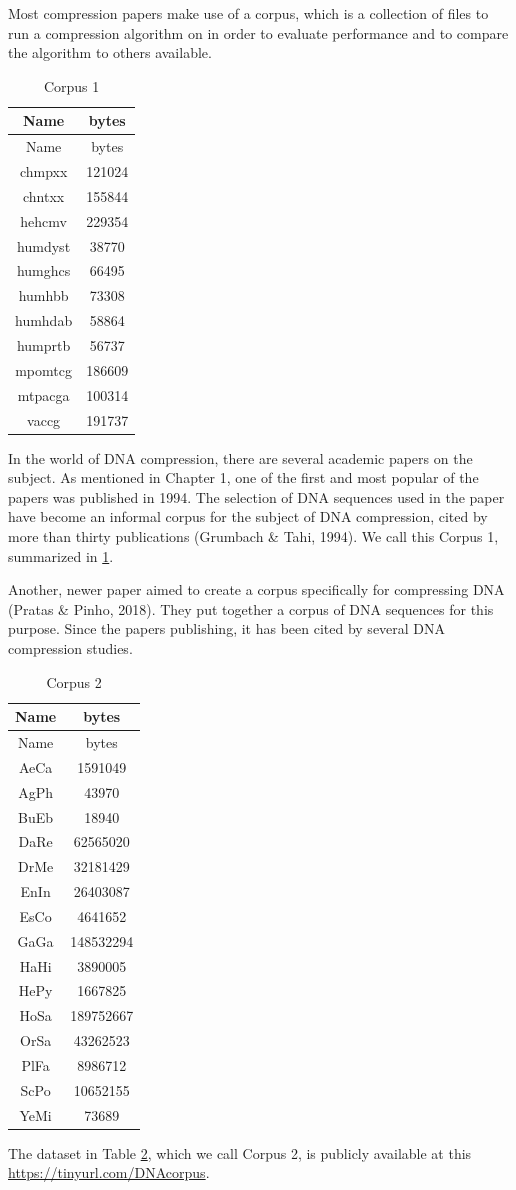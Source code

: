\documentclass[12pt,twoside]{reedthesis}
\begin{document}
Most compression papers make use of a corpus, which is a collection of files to run a compression algorithm on in order to evaluate performance and to compare the algorithm to others available.
\begin{longtable}[]{@{}cc@{}}
\caption{\label{tab:corpus1filesfig}Corpus 1}\tabularnewline
\toprule()
Name & bytes \\
\midrule()
\endfirsthead
\toprule()
Name & bytes \\
\midrule()
\endhead
chmpxx & 121024 \\
chntxx & 155844 \\
hehcmv & 229354 \\
humdyst & 38770 \\
humghcs & 66495 \\
humhbb & 73308 \\
humhdab & 58864 \\
humprtb & 56737 \\
mpomtcg & 186609 \\
mtpacga & 100314 \\
vaccg & 191737 \\
\bottomrule()
\end{longtable}
In the world of DNA compression, there are several academic papers on the subject. As mentioned in Chapter 1, one of the first and most popular of the papers was published in 1994. The selection of DNA sequences used in the paper have become an informal corpus for the subject of DNA compression, cited by more than thirty publications (Grumbach \& Tahi, 1994). We call this Corpus 1, summarized in \ref{tab:corpus1filesfig}.

Another, newer paper aimed to create a corpus specifically for compressing DNA (Pratas \& Pinho, 2018). They put together a corpus of DNA sequences for this purpose. Since the papers publishing, it has been cited by several DNA compression studies.
\begin{longtable}[]{@{}cc@{}}
\caption{\label{tab:corpus2filesfig}Corpus 2}\tabularnewline
\toprule()
Name & bytes \\
\midrule()
\endfirsthead
\toprule()
Name & bytes \\
\midrule()
\endhead
AeCa & 1591049 \\
AgPh & 43970 \\
BuEb & 18940 \\
DaRe & 62565020 \\
DrMe & 32181429 \\
EnIn & 26403087 \\
EsCo & 4641652 \\
GaGa & 148532294 \\
HaHi & 3890005 \\
HePy & 1667825 \\
HoSa & 189752667 \\
OrSa & 43262523 \\
PlFa & 8986712 \\
ScPo & 10652155 \\
YeMi & 73689 \\
\bottomrule()
\end{longtable}
The dataset in Table \ref{tab:corpus2filesfig}, which we call Corpus 2, is publicly available at this \url{https://tinyurl.com/DNAcorpus}.
\end{document}
